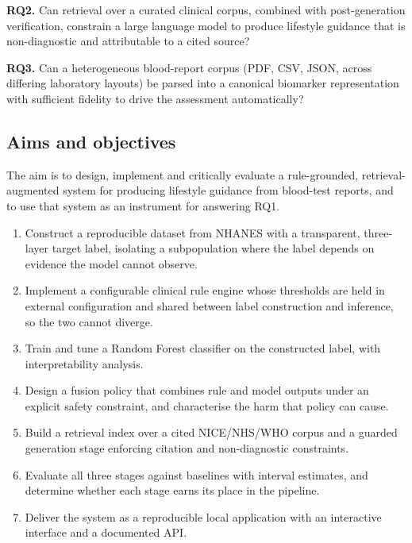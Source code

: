 \documentclass[11pt,a4paper]{article}
\begin{document}
\medskip
\noindent\textbf{RQ2.} Can retrieval over a curated clinical corpus, combined with
post-generation verification, constrain a large language model to produce lifestyle
guidance that is non-diagnostic and attributable to a cited source?

\medskip
\noindent\textbf{RQ3.} Can a heterogeneous blood-report corpus (PDF, CSV, JSON,
across differing laboratory layouts) be parsed into a canonical biomarker
representation with sufficient fidelity to drive the assessment automatically?

\subsection{Aims and objectives}

The aim is to design, implement and critically evaluate a rule-grounded,
retrieval-augmented system for producing lifestyle guidance from blood-test
reports, and to use that system as an instrument for answering RQ1.

\begin{enumerate}[label=\textbf{O\arabic*.}, leftmargin=*]
  \item Construct a reproducible dataset from NHANES with a transparent,
    three-layer target label, isolating a subpopulation where the label depends on
    evidence the model cannot observe.
  \item Implement a configurable clinical rule engine whose thresholds are held in
    external configuration and shared between label construction and inference, so
    the two cannot diverge.
  \item Train and tune a Random Forest classifier on the constructed label, with
    interpretability analysis.
  \item Design a fusion policy that combines rule and model outputs under an
    explicit safety constraint, and characterise the harm that policy can cause.
  \item Build a retrieval index over a cited NICE/NHS/WHO corpus and a guarded
    generation stage enforcing citation and non-diagnostic constraints.
  \item Evaluate all three stages against baselines with interval estimates, and
    determine whether each stage earns its place in the pipeline.
  \item Deliver the system as a reproducible local application with an interactive
    interface and a documented API.
\end{enumerate}
\end{document}
